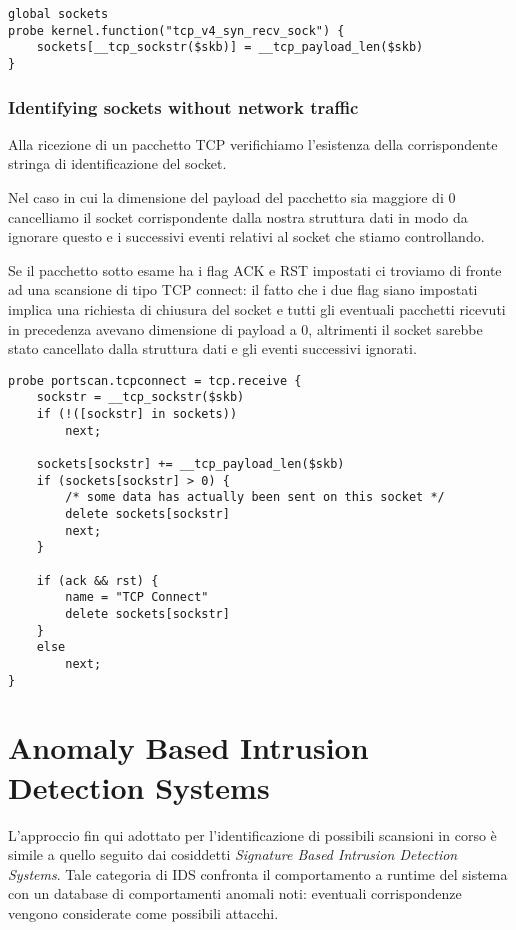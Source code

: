 \documentclass[11pt]{article}
\begin{document}
\begin{lstlisting}
global sockets
probe kernel.function("tcp_v4_syn_recv_sock") {
    sockets[__tcp_sockstr($skb)] = __tcp_payload_len($skb)
}
\end{lstlisting}

\subsubsection{Identifying sockets without network traffic}
Alla ricezione di un pacchetto TCP verifichiamo l'esistenza della
corrispondente stringa di identificazione del socket.

Nel caso in cui la dimensione del payload del pacchetto sia maggiore di 0
cancelliamo il socket corrispondente dalla nostra struttura dati in modo da
ignorare questo e i successivi eventi relativi al socket che stiamo
controllando.

Se il pacchetto sotto esame ha i flag ACK e RST impostati ci troviamo di fronte
ad una scansione di tipo TCP connect: il fatto che i due flag siano impostati
implica una richiesta di chiusura del socket e tutti gli eventuali pacchetti
ricevuti in precedenza avevano dimensione di payload a 0, altrimenti il socket
sarebbe stato cancellato dalla struttura dati e gli eventi successivi ignorati.

\begin{lstlisting}
probe portscan.tcpconnect = tcp.receive {
    sockstr = __tcp_sockstr($skb)
    if (!([sockstr] in sockets))
        next;

    sockets[sockstr] += __tcp_payload_len($skb)
    if (sockets[sockstr] > 0) {
        /* some data has actually been sent on this socket */
        delete sockets[sockstr]
        next;
    }

    if (ack && rst) {
        name = "TCP Connect"
        delete sockets[sockstr]
    }
    else
        next;
}
\end{lstlisting}

\pagebreak

\section{Anomaly Based Intrusion Detection Systems} 
L'approccio fin qui adottato per l'identificazione di possibili scansioni in
corso è simile a quello seguito dai cosiddetti \emph{Signature Based Intrusion
Detection Systems}. Tale categoria di IDS confronta il comportamento a runtime
del sistema con un database di comportamenti anomali noti: eventuali
corrispondenze vengono considerate come possibili attacchi.
\end{document}
